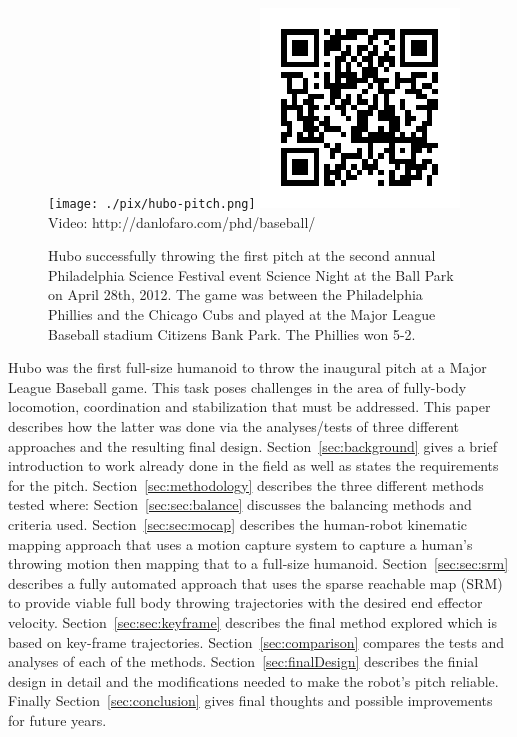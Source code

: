 \begin{figure}[t]
  \centering
\texttt{[image: ./pix/hubo-pitch.png]}
\includegraphics[width=0.3\columnwidth]{./qrcode/qrcode-baseball.png}\\
      Video: http://danlofaro.com/phd/baseball/
      
  \caption{Hubo successfully throwing the first pitch at the second annual Philadelphia Science Festival event Science Night at the Ball Park on April 28th, 2012.  The game was between the Philadelphia Phillies and the Chicago Cubs and played at the Major League Baseball stadium Citizens Bank Park.  The Phillies won 5-2.}
  \label{fig:hubo-throw}
\end{figure}



Hubo was the first full-size humanoid to throw the inaugural pitch at a Major League Baseball game.  
This task poses challenges in the area of fully-body locomotion, coordination and stabilization that must be addressed.
This paper describes how the latter was done via the analyses/tests of three different approaches and the resulting final design.
Section~\ref{sec:background} gives a brief introduction to work already done in the field as well as states the requirements for the pitch.
Section~\ref{sec:methodology} describes the three different methods tested where:
Section~\ref{sec:sec:balance} discusses the balancing methods and criteria used.
Section~\ref{sec:sec:mocap} describes the human-robot kinematic mapping approach that uses a motion capture system to capture a human's throwing motion then mapping that to a full-size humanoid.  
Section~\ref{sec:sec:srm} describes a fully automated approach that uses the sparse reachable map (SRM) to provide viable full body throwing trajectories with the desired end effector velocity\cite{dlofaro-srm}.
Section~\ref{sec:sec:keyframe} describes the final method explored which is based on key-frame trajectories.
Section~\ref{sec:comparison} compares the tests and analyses of each of the methods.
Section~\ref{sec:finalDesign} describes the finial design in detail and the modifications needed to make the robot's pitch reliable.
Finally Section~\ref{sec:conclusion} gives final thoughts and possible improvements for future years.


